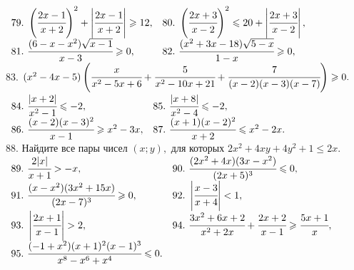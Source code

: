 \documentclass[12pt]{article}
\begin{document}
$\begin{array}{ll}
79.\ \left(\cfrac{2x-1}{x+2}\right)^2+\left|\cfrac{2x-1}{x+2}\right|\geqslant12,&
80.\ \left(\cfrac{2x+3}{x-2}\right)^2\leqslant20+\left|\cfrac{2x+3}{x-2}\right|,\\
81.\ \cfrac{(6-x-x^2)\sqrt{x-1}}{x-3}\geqslant0,&
82.\ \cfrac{(x^2+3x-18)\sqrt{5-x}}{1-x}\geqslant0,
\end{array}$\\
83. $(x^2-4x-5)\left(\cfrac{x}{x^2-5x+6}+\cfrac{5}{x^2-10x+21}+\cfrac{7}{(x-2)(x-3)(x-7)}\right)\geqslant0.$\\
$\begin{array}{ll}
84.\ \cfrac{|x+2|}{x^2-1}\leqslant-2,&
85.\ \cfrac{|x+8|}{x^2-4}\leqslant-2,\\
86.\ \cfrac{(x-2)(x-3)^2}{x-1}\geqslant x^2-3x,&
87.\ \cfrac{(x+1)(x-2)^2}{x+2}\leqslant x^2-2x.
\end{array}$\\
88. Найдите все пары чисел $(x;y),$ для которых $2x^2+4xy+4y^2+1\leqslant 2x.$\\
$\begin{array}{ll}
89.\ \cfrac{2|x|}{x+1}>-x,&
90.\ \cfrac{(2x^2+4x)(3x-x^2)}{(2x+5)^3}\leqslant 0,\\
91.\ \cfrac{(x-x^2)(3x^2+15x)}{(2x-7)^3}\geqslant 0,&
92.\ \left|\cfrac{x-3}{x+4}\right|<1,\\
93.\ \left|\cfrac{2x+1}{x-1}\right|>2,&
94.\ \cfrac{3x^2+6x+2}{x^2+2x}+\cfrac{2x+2}{x-1}\geqslant\cfrac{5x+1}{x},\\
95.\ \cfrac{(-1+x^2)(x+1)^2(x-1)^3}{x^8-x^6+x^4}\leqslant0.
\end{array}$
\newpage
\end{document}
